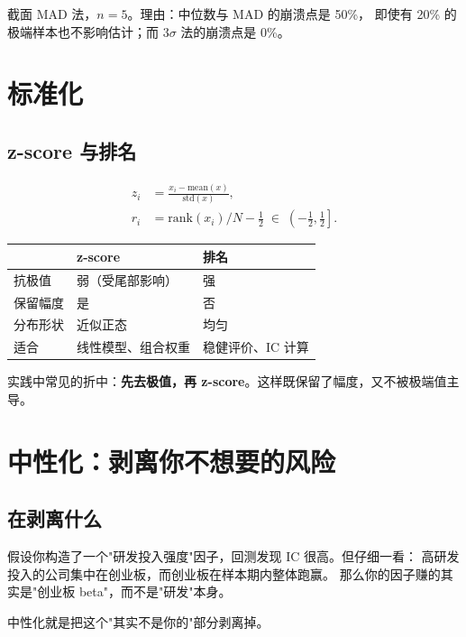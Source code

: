 \begin{keybox}[本书的选择]
截面 MAD 法，$n=5$。理由：中位数与 MAD 的崩溃点是 50\%，
即使有 20\% 的极端样本也不影响估计；而 $3\sigma$ 法的崩溃点是 0\%。
\end{keybox}

\section{标准化}

\subsection{z-score 与排名}

\begin{align}
  z_{i} &= \frac{x_i - \mathrm{mean}(x)}{\mathrm{std}(x)}, \\
  r_{i} &= \mathrm{rank}(x_i)/N - \tfrac12 \;\in\; \left(-\tfrac12, \tfrac12\right].
\end{align}

\begin{center}
\begin{tabular}{@{}lll@{}}
\toprule
 & \textbf{z-score} & \textbf{排名} \\
\midrule
抗极值 & 弱（受尾部影响） & 强 \\
保留幅度 & 是 & 否 \\
分布形状 & 近似正态 & 均匀 \\
适合 & 线性模型、组合权重 & 稳健评价、IC 计算 \\
\bottomrule
\end{tabular}
\end{center}

实践中常见的折中：\textbf{先去极值，再 z-score}。这样既保留了幅度，又不被极端值主导。

\section{中性化：剥离你不想要的风险}

\subsection{在剥离什么}

假设你构造了一个"研发投入强度"因子，回测发现 IC 很高。但仔细一看：
高研发投入的公司集中在创业板，而创业板在样本期内整体跑赢。
那么你的因子赚的其实是"创业板 beta"，而不是"研发"本身。

中性化就是把这个"其实不是你的"部分剥离掉。


